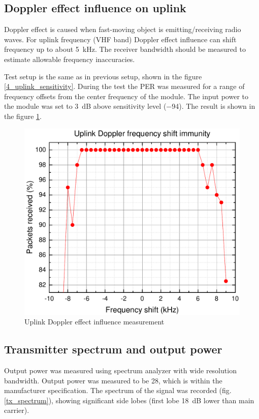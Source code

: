 \subsection{Doppler effect influence on uplink}
Doppler effect is caused when fast-moving object is emitting/receiving radio waves. For uplink frequency (VHF band) Doppler effect influence can shift frequency up to about \SI{5}{\kHz}. The receiver bandwidth should be measured to estimate allowable frequency inaccuracies.

Test setup is the same as in previous setup, shown in the figure \ref{4_uplink_sensitivity}. During the test the PER was measured for a range of frequency offsets from the center frequency of the module. The input power to the module was set to \SI{3}{\dB} above sensitivity level (\SI{-94}{\dBm}).  The result is shown in the figure \ref{4_uplink_doppler_measurement}.
\begin{figure}[H]
    \centering
    \includegraphics[width=0.6\paperwidth]{img/6/uplink_doppler.pdf}
    \caption{Uplink Doppler effect influence measurement}
    \label{4_uplink_doppler_measurement}
\end{figure}


\subsection{Transmitter spectrum and output power}
Output power was measured using spectrum analyzer with wide resolution bandwidth. Output power was measured to be \SI{28}{\dBm}, which is within the manufacturer specification.
The spectrum of the signal was recorded (fig. \ref{tx_spectrum}), showing significant side lobes (first lobe \SI{18}{\dB} lower than main carrier).

